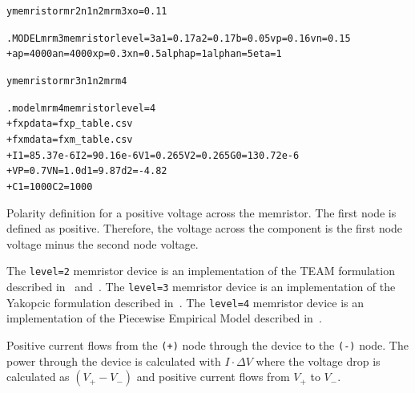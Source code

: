 \begin{Device}
\begin{alltt}
ymemristor mr2 n1 n2 mrm3 xo=0.11 

.MODEL mrm3 memristor level=3 a1=0.17 a2=0.17 b=0.05 vp=0.16 vn=0.15 
+ ap=4000 an=4000 xp=0.3 xn=0.5 alphap=1 alphan=5 eta=1 


ymemristor mr3 n1 n2 mrm4 

.model mrm4 memristor level=4 
+ fxpdata=fxp_table.csv
+ fxmdata=fxm_table.csv
+ I1=85.37e-6 I2=90.16e-6 V1=0.265 V2=0.265 G0=130.72e-6
+ VP=0.7 VN=1.0 d1=9.87 d2=-4.82
+ C1=1000 C2=1000

\end{alltt}

\parameters

\begin{Parameters}

Polarity definition for a positive voltage across the memristor. The
first node is defined as positive. Therefore, the voltage across the
component is the first node voltage minus the second node voltage.


\end{Parameters}

\comments
The {\tt level=2} memristor device is an implementation of the TEAM formulation described 
in~\cite{KvatinskyFriedman2012} and~\cite{KvatinskyFriedman2013}.
The {\tt level=3}  memristor device is an implementation of the Yakopcic formulation described 
in~\cite{ChrisYakopcic2013}. The {\tt level=4} memristor device is an implementation of the 
Piecewise Empirical Model described in~\cite{Niroula2017}.

Positive current flows from
the \texttt{(+)} node through the device to the \texttt{(-)}
node. The power through the device is calculated 
with $I \cdot \Delta V$ where the voltage drop is calculated as $(V_+ - V_-)$ 
and positive current flows from $V_+$ to $V_-$.  
\end{Device}

